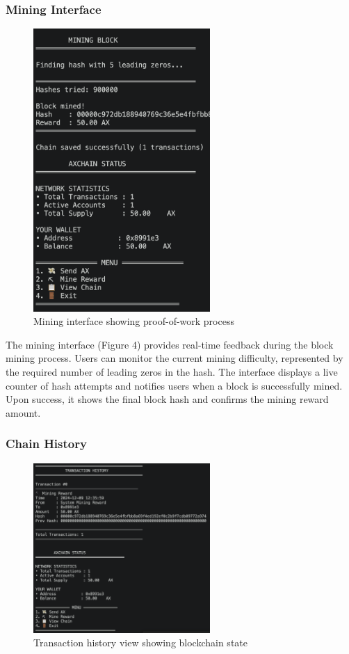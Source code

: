 \documentclass[12pt]{article}
\begin{document}
\subsubsection{Mining Interface}
\begin{figure}[H]
\centering
\includegraphics[width=0.6\textwidth]{mining_menu}
\caption{Mining interface showing proof-of-work process}
\end{figure}

The mining interface (Figure 4) provides real-time feedback during the block mining process. Users can monitor the current mining difficulty, represented by the required number of leading zeros in the hash. The interface displays a live counter of hash attempts and notifies users when a block is successfully mined. Upon success, it shows the final block hash and confirms the mining reward amount.

\subsubsection{Chain History}
\begin{figure}[H]
\centering
\includegraphics[width=0.6\textwidth]{history_menu}
\caption{Transaction history view showing blockchain state}
\end{figure}
\end{document}

